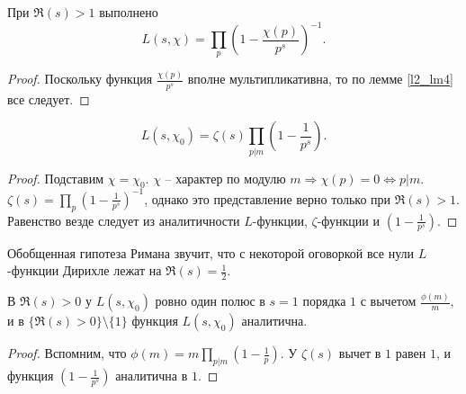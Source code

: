 \begin{lemma} \label{l7_Euler_ident}
	При $\Re(s) > 1$ выполнено
	$$L(s, \chi) = \prod_{p} \left(1 - \frac{\chi(p)}{p^s} \right)^{-1}.$$
\end{lemma}
\begin{proof}
	Поскольку функция $\displaystyle \frac{\chi(p)}{p^s}$ вполне мультипликативна, то по лемме \ref{l2_lm4} все следует.
\end{proof}

\begin{corollary} \label{l7_cor1}
	$$L(s, \chi_0) = \zeta(s) \prod_{p | m} \left( 1 - \frac{1}{p^s} \right).$$
\end{corollary}
\begin{proof}	
	Подставим $\chi = \chi_0$. $\chi$ -- характер по модулю $m \Rightarrow \chi(p) = 0 \Leftrightarrow p | m$. 
	$\displaystyle \zeta(s) = \prod_p  \left( 1 - \frac{1}{p^s} \right)^{-1}$, однако это представление верно только при 
	$\Re(s) > 1$. Равенство везде следует из аналитичности $L$-функции, $\zeta$-функции и $\displaystyle \left(1 - \frac{1}{p^s} \right)$. 
\end{proof}	

\begin{note}
	Обобщенная гипотеза Римана звучит, что с некоторой оговоркой все нули $L$-функции Дирихле лежат на 
	$\displaystyle \Re(s) = \frac{1}{2}$.
\end{note}

\begin{corollary} \label{l7_col2}
	В $\Re(s) > 0$ у $L(s, \chi_0)$ ровно один полюс в $s = 1$ порядка $1$ с вычетом $\displaystyle \frac{\phi(m)}{m}$, и в $\lbrace \Re(s) > 0 \rbrace \setminus \lbrace{1\rbrace}$ функция $L(s, \chi_0)$ аналитична.
\end{corollary}
\begin{proof}
	Вспомним, что $\displaystyle \phi(m) = m \prod_{p | m} \left( 1 - \frac{1}{p} \right)$. У $\zeta(s)$ вычет в $1$ равен $1$, и функция $\displaystyle \left(1 - \frac{1}{p^s} \right)$ аналитична в $1$.
\end{proof}

